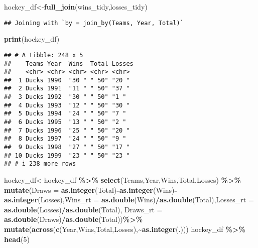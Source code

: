\documentclass[
]{article}
\newenvironment{Shaded}{\begin{snugshade}}{\end{snugshade}}
\newcommand{\AttributeTok}[1]{\textcolor[rgb]{0.13,0.29,0.53}{#1}}
\newcommand{\DecValTok}[1]{\textcolor[rgb]{0.00,0.00,0.81}{#1}}
\newcommand{\FunctionTok}[1]{\textcolor[rgb]{0.13,0.29,0.53}{\textbf{#1}}}
\newcommand{\NormalTok}[1]{#1}
\newcommand{\OtherTok}[1]{\textcolor[rgb]{0.56,0.35,0.01}{#1}}
\newcommand{\SpecialCharTok}[1]{\textcolor[rgb]{0.81,0.36,0.00}{\textbf{#1}}}
\begin{document}
\begin{Shaded}
\begin{Highlighting}[]
\NormalTok{hockey\_df}\OtherTok{\textless{}{-}}\FunctionTok{full\_join}\NormalTok{(wins\_tidy,losses\_tidy)}
\end{Highlighting}
\end{Shaded}

\begin{verbatim}
## Joining with `by = join_by(Teams, Year, Total)`
\end{verbatim}

\begin{Shaded}
\begin{Highlighting}[]
\FunctionTok{print}\NormalTok{(hockey\_df)}
\end{Highlighting}
\end{Shaded}

\begin{verbatim}
## # A tibble: 248 x 5
##    Teams Year  Wins  Total Losses
##    <chr> <chr> <chr> <chr> <chr> 
##  1 Ducks 1990  "30 " " 50" "20 " 
##  2 Ducks 1991  "11 " " 50" "37 " 
##  3 Ducks 1992  "30 " " 50" "1 "  
##  4 Ducks 1993  "12 " " 50" "30 " 
##  5 Ducks 1994  "24 " " 50" "7 "  
##  6 Ducks 1995  "13 " " 50" "2 "  
##  7 Ducks 1996  "25 " " 50" "20 " 
##  8 Ducks 1997  "24 " " 50" "9 "  
##  9 Ducks 1998  "27 " " 50" "17 " 
## 10 Ducks 1999  "23 " " 50" "23 " 
## # i 238 more rows
\end{verbatim}

\begin{Shaded}
\begin{Highlighting}[]
\NormalTok{hockey\_df}\OtherTok{\textless{}{-}}\NormalTok{hockey\_df }\SpecialCharTok{\%\textgreater{}\%}
  \FunctionTok{select}\NormalTok{(Teams,Year,Wins,Total,Losses) }\SpecialCharTok{\%\textgreater{}\%}
  \FunctionTok{mutate}\NormalTok{(}\AttributeTok{Draws =} \FunctionTok{as.integer}\NormalTok{(Total)}\SpecialCharTok{{-}}\FunctionTok{as.integer}\NormalTok{(Wins)}\SpecialCharTok{{-}}\FunctionTok{as.integer}\NormalTok{(Losses),}\AttributeTok{Wins\_rt =} \FunctionTok{as.double}\NormalTok{(Wins)}\SpecialCharTok{/}\FunctionTok{as.double}\NormalTok{(Total),}\AttributeTok{Losses\_rt =} \FunctionTok{as.double}\NormalTok{(Losses)}\SpecialCharTok{/}\FunctionTok{as.double}\NormalTok{(Total), }\AttributeTok{Draws\_rt =} \FunctionTok{as.double}\NormalTok{(Draws)}\SpecialCharTok{/}\FunctionTok{as.double}\NormalTok{(Total))}\SpecialCharTok{\%\textgreater{}\%}
  \FunctionTok{mutate}\NormalTok{(}\FunctionTok{across}\NormalTok{(}\FunctionTok{c}\NormalTok{(Year,Wins,Total,Losses),}\SpecialCharTok{\textasciitilde{}}\FunctionTok{as.integer}\NormalTok{(.)))}
\NormalTok{hockey\_df }\SpecialCharTok{\%\textgreater{}\%} \FunctionTok{head}\NormalTok{(}\DecValTok{5}\NormalTok{)}
\end{Highlighting}
\end{Shaded}
\end{document}
